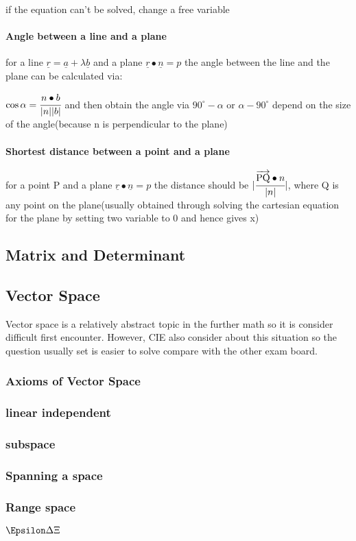 \documentclass[]{article}
\let\oldparagraph\paragraph
\renewcommand{\paragraph}[1]{\oldparagraph{#1}\mbox{}}
\begin{document}
if the equation can't be solved, change a free variable

\paragraph{Angle between a line and a plane}\label{header-n311}

for a line \(\underline{r} = \underline{a} + \lambda\underline{b}\) and
a plane \(\underline{r}\bullet\underline{n} = p\) the angle between the
line and the plane can be calculated via:

\(\cos{\alpha} = \cfrac{n\bullet b}{|n||b|}\) and then obtain the angle
via \(90^{\circ} - \alpha\) or \(\alpha - 90^{\circ} \) depend on the
size of the angle(because n is perpendicular to the plane)

\paragraph{Shortest distance between a point and a
plane}\label{header-n307}

for a point P and a plane \(\underline{r}\bullet\underline{n} = p\) the
distance should be \(|\cfrac{\overrightarrow{\rm PQ}\bullet n}{|n|}|\),
where Q is any point on the plane(usually obtained through solving the
cartesian equation for the plane by setting two variable to 0 and hence
gives x)

\subsection{Matrix and Determinant}\label{header-n287}

\subsection{Vector Space}\label{header-n289}

Vector space is a relatively abstract topic in the further math so it is
consider difficult first encounter. However, CIE also consider about
this situation so the question usually set is easier to solve compare
with the other exam board.

\subsubsection{Axioms of Vector Space}\label{header-n291}

\subsubsection{linear independent}\label{header-n292}

\subsubsection{subspace}\label{header-n293}

\subsubsection{Spanning a space}\label{header-n294}

\subsubsection{Range space}\label{header-n295}

\(\Epsilon \Delta\Xi\)
\end{document}
